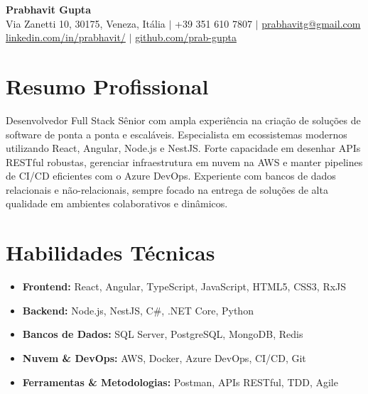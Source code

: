 \documentclass[11pt,a4paper]{article}
\begin{document}
\begin{center}
    {\Huge \textbf{Prabhavit Gupta}} \\
    \vspace{2mm}
    Via Zanetti 10, 30175, Veneza, Itália $\vert$ +39 351 610 7807 $\vert$ \href{mailto:prabhavitg@gmail.com}{prabhavitg@gmail.com} \\
    \href{https://www.linkedin.com/in/prabhavit/}{linkedin.com/in/prabhavit/} $\vert$ \href{https://github.com/prab-gupta}{github.com/prab-gupta}
\end{center}

\vspace{5mm}
\section*{Resumo Profissional}
Desenvolvedor Full Stack Sênior com ampla experiência na criação de soluções de software de ponta a ponta e escaláveis. Especialista em ecossistemas modernos utilizando React, Angular, Node.js e NestJS. Forte capacidade em desenhar APIs RESTful robustas, gerenciar infraestrutura em nuvem na AWS e manter pipelines de CI/CD eficientes com o Azure DevOps. Experiente com bancos de dados relacionais e não-relacionais, sempre focado na entrega de soluções de alta qualidade em ambientes colaborativos e dinâmicos.

\section*{Habilidades Técnicas}
\begin{itemize}[leftmargin=*]
    \item \textbf{Frontend:} React, Angular, TypeScript, JavaScript, HTML5, CSS3, RxJS
    \item \textbf{Backend:} Node.js, NestJS, C\#, .NET Core, Python
    \item \textbf{Bancos de Dados:} SQL Server, PostgreSQL, MongoDB, Redis
    \item \textbf{Nuvem \& DevOps:} AWS, Docker, Azure DevOps, CI/CD, Git
    \item \textbf{Ferramentas \& Metodologias:} Postman, APIs RESTful, TDD, Agile
\end{itemize}
\end{document}
